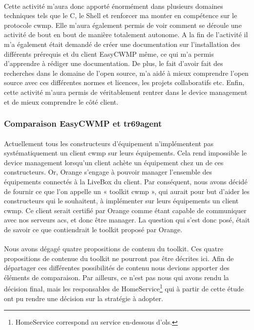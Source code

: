 \documentclass[12pt,a4paper]{report}
\begin{document}
\paragraph*{}Cette activité m’aura donc apporté énormément dans plusieurs domaines techniques tels que le C, le Shell et renforcer ma monter en compétence sur le protocole \gls{cwmp}. Elle m’aura également permis de voir comment se déroule une activité de bout en bout de manière totalement autonome. A la fin de l’activité il m’a également était demandé de créer une documentation sur l’installation des différents prérequis et du client EasyCWMP même, ce qui m’a permis d’apprendre à rédiger une documentation. De plus, le fait d’avoir fait des recherches dans le domaine de l’open source, m’a aidé à mieux comprendre l’open source avec ces différentes normes et licences, les projets collaboratifs etc. Enfin, cette activité m’aura permis de véritablement rentrer dans le device management et de mieux comprendre le côté client. \\
\subsubsection{Comparaison EasyCWMP et tr69agent}
\paragraph*{}Actuellement tous les constructeurs d’équipement n’implémentent pas
systématiquement un client \gls{cwmp} sur leurs équipements. Cela rend impossible le device management lorsqu’un client achète un équipement chez un de ces constructeurs. Or, Orange s’engage à pouvoir manager l’ensemble des équipements connectés à la LiveBox du client. Par conséquent, nous avons décidé de fournir ce que l’on appelle un « toolkit \gls{cwmp} », qui aurait pour but d’aider les constructeurs qui le souhaitent, à implémenter sur leurs équipements un client \gls{cwmp}. Ce client serait certifié par Orange comme étant capable de communiquer avec nos serveurs \gls{acs}, et donc être manager. La question qui s’est donc posé, était de savoir ce que contiendrait le toolkit proposé par Orange.
\paragraph*{}Nous avons dégagé quatre propositions de contenu du toolkit. Ces quatre propositions de contenue du toolkit ne pourront pas être décrites ici. Afin de départager ces différentes possibilités de contenu nous devions apporter des éléments de comparaison. Par ailleurs, ce n’est pas nous qui avons rendu la décision final, mais les responsables de HomeService\footnote{HomeService correspond au service en-dessous d'\gls{ols}.} qui à partir de cette étude ont pu rendre une décision sur la stratégie à adopter.
\end{document}
